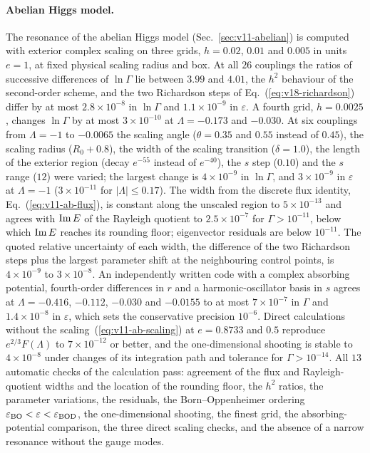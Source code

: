 \paragraph{Abelian Higgs model.}
The resonance of the abelian Higgs model (Sec.~\ref{sec:v11-abelian}) is computed with exterior complex scaling on three grids, $h=0.02$, $0.01$ and $0.005$ in units $e=1$, at fixed physical scaling radius and box. %
At all $26$ couplings the ratios of successive differences of $\ln\Gamma$ lie between $3.99$ and $4.01$, the $h^2$ behaviour of the second-order scheme, and the two Richardson steps of Eq.~(\ref{eq:v18-richardson}) differ by at most $2.8\times10^{-8}$ in $\ln\Gamma$ and $1.1\times10^{-9}$ in $\varepsilon$. %
A fourth grid, $h=0.0025$, changes $\ln\Gamma$ by at most $3\times10^{-10}$ at $\Lambda=-0.173$ and $-0.030$. %
At six couplings from $\Lambda=-1$ to $-0.0065$ the scaling angle ($\theta=0.35$ and $0.55$ instead of $0.45$), the scaling radius ($R_0+0.8$), the width of the scaling transition ($\delta=1.0$), the length of the exterior region (decay $e^{-55}$ instead of $e^{-40}$), the $s$ step ($0.10$) and the $s$ range ($12$) were varied; the largest change is $4\times10^{-9}$ in $\ln\Gamma$, and $3\times10^{-9}$ in $\varepsilon$ at $\Lambda=-1$ ($3\times10^{-11}$ for $|\Lambda|\le0.17$). %
The width from the discrete flux identity, Eq.~(\ref{eq:v11-ab-flux}), is constant along the unscaled region to $5\times10^{-13}$ and agrees with ${\rm Im}\,E$ of the Rayleigh quotient to $2.5\times10^{-7}$ for $\Gamma>10^{-11}$, below which ${\rm Im}\,E$ reaches its rounding floor; eigenvector residuals are below $10^{-11}$. %
The quoted relative uncertainty of each width, the difference of the two Richardson steps plus the largest parameter shift at the neighbouring control points, is $4\times10^{-9}$ to $3\times10^{-8}$. %
An independently written code with a complex absorbing potential, fourth-order differences in $r$ and a harmonic-oscillator basis in $s$ agrees at $\Lambda=-0.416$, $-0.112$, $-0.030$ and $-0.0155$ to at most $7\times10^{-7}$ in $\Gamma$ and $1.4\times10^{-8}$ in $\varepsilon$, which sets the conservative precision $10^{-6}$. %
Direct calculations without the scaling~(\ref{eq:v11-ab-scaling}) at $e=0.8733$ and $0.5$ reproduce $e^{2/3}F(\Lambda)$ to $7\times10^{-12}$ or better, and the one-dimensional shooting is stable to $4\times10^{-8}$ under changes of its integration path and tolerance for $\Gamma>10^{-14}$. %
All $13$ automatic checks of the calculation pass: agreement of the flux and Rayleigh-quotient widths and the location of the rounding floor, the $h^2$ ratios, the parameter variations, the residuals, the Born--Oppenheimer ordering $\varepsilon_{\rm BO}<\varepsilon<\varepsilon_{\rm BOD}$, the one-dimensional shooting, the finest grid, the absorbing-potential comparison, the three direct scaling checks, and the absence of a narrow resonance without the gauge modes. %
